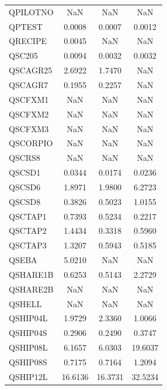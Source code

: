 \begin{longtable}{lccc}
QPILOTNO &           NaN &           NaN &           NaN \\
QPTEST   &        0.0008 &        0.0007 &        0.0012 \\
QRECIPE  &        0.0045 &           NaN &           NaN \\
QSC205   &        0.0094 &        0.0032 &        0.0032 \\
QSCAGR25 &        2.6922 &        1.7470 &           NaN \\
QSCAGR7  &        0.1955 &        0.2257 &           NaN \\
QSCFXM1  &           NaN &           NaN &           NaN \\
QSCFXM2  &           NaN &           NaN &           NaN \\
QSCFXM3  &           NaN &           NaN &           NaN \\
QSCORPIO &           NaN &           NaN &           NaN \\
QSCRS8   &           NaN &           NaN &           NaN \\
QSCSD1   &        0.0344 &        0.0174 &        0.0236 \\
QSCSD6   &        1.8971 &        1.9800 &        6.2723 \\
QSCSD8   &        0.3826 &        0.5023 &        1.0155 \\
QSCTAP1  &        0.7393 &        0.5234 &        0.2217 \\
QSCTAP2  &        1.4434 &        0.3318 &        0.5960 \\
QSCTAP3  &        1.3207 &        0.5943 &        0.5185 \\
QSEBA    &        5.0210 &           NaN &           NaN \\
QSHARE1B &        0.6253 &        0.5143 &        2.2729 \\
QSHARE2B &           NaN &           NaN &           NaN \\
QSHELL   &           NaN &           NaN &           NaN \\
QSHIP04L &        1.9729 &        2.3360 &        1.0066 \\
QSHIP04S &        0.2906 &        0.2490 &        0.3747 \\
QSHIP08L &        6.1657 &        6.0303 &       19.6037 \\
QSHIP08S &        0.7175 &        0.7164 &        1.2094 \\
QSHIP12L &       16.6136 &       16.3731 &       32.5234 \\

\end{longtable}
